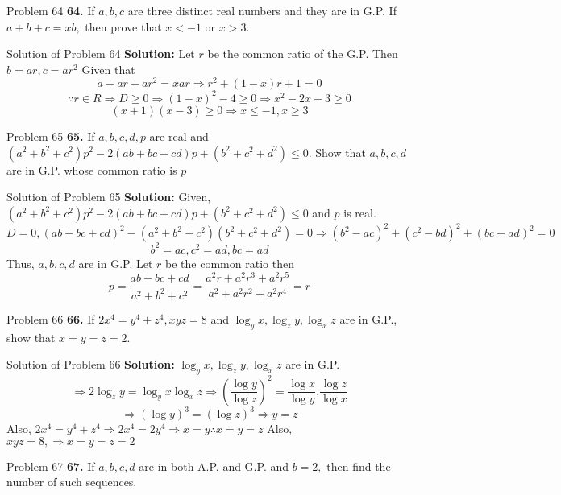 \documentclass[aspectratio=1610,8pt]{beamer}
\begin{document}
\begin{frame}{Problem 64}
  \textbf{64.} If $a, b, c$ are three distinct real numbers and they are in G.P. If $a + b + c = xb,$ then prove that $x < -1$ or
  $x > 3.$
\end{frame}
\begin{frame}{Solution of Problem 64}
  \textbf{Solution:} Let $r$ be the common ratio of the G.P. Then $b = ar, c = ar^2$ Given that
  $$a + ar + ar^2 = xar \Rightarrow r^2 + (1 - x)r + 1 = 0$$
  $$\because r\in R \Rightarrow D \geq 0 \Rightarrow (1 - x)^2 - 4 \geq 0 \Rightarrow x^2 - 2x - 3 \geq 0$$
  $$(x + 1)(x - 3)\geq 0 \Rightarrow x\leq -1, x \geq 3$$
\end{frame}
\begin{frame}{Problem 65}
  \textbf{65.} If $a, b, c, d, p$ are real and $(a^2 + b^2 + c^2)p^2 - 2(ab + bc + cd)p + (b^2 + c^2 + d^2)\leq 0.$ Show that $a,
  b, c, d$ are in G.P. whose common ratio is $p$
\end{frame}
\begin{frame}{Solution of Problem 65}
  \textbf{Solution:} Given, $(a^2 + b^2 + c^2)p^2 - 2(ab + bc + cd)p + (b^2 + c^2 + d^2)\leq 0$ and $p$ is real.
  $$D = 0, (ab + bc + cd)^2 - (a^2 + b^2 + c^2)(b^2 + c^2 + d^2) = 0 \Rightarrow (b^2 - ac)^2 + (c^2 - bd)^2 + (bc - ad)^2 = 0$$
  $$b^2 = ac, c^2 = ad, bc = ad$$
  Thus, $a, b, c, d$ are in G.P. Let $r$ be the common ratio then
  $$p = \frac{ab + bc + cd}{a^2 + b^2 + c^2} = \frac{a^2r + a^2r^3 + a^2r^5}{a^2 + a^2r^2 + a^2r^4} = r$$
\end{frame}
\begin{frame}{Problem 66}
  \textbf{66.} If $2x^4 = y^4 + z^4, xyz = 8$ and $\log_yx, \log_zy, \log_xz$ are in G.P., show that $x = y = z = 2.$
\end{frame}
\begin{frame}{Solution of Problem 66}
  \textbf{Solution:} $\log_yx, \log_zy, \log_xz$ are in G.P.
  $$\Rightarrow 2\log_zy = \log_yx\log_xz \Rightarrow \left(\frac{\log y}{\log z}\right)^2 = \frac{\log x}{\log y}.\frac{\log
    z}{\log x}$$
  $$\Rightarrow (\log y)^3 = (\log z)^3 \Rightarrow y = z$$
  Also, $2x^4 = y^4 + z^4 \Rightarrow 2x^4 = 2y^4 \Rightarrow x = y \therefore x = y = z$
  \linebreak\linebreak
  Also, $xyz = 8, \Rightarrow x = y = z = 2$
\end{frame}
\begin{frame}{Problem 67}
  \textbf{67.} If $a, b, c, d$ are in both A.P. and G.P. and $b = 2,$ then find the number of such sequences.
\end{frame}
\end{document}
